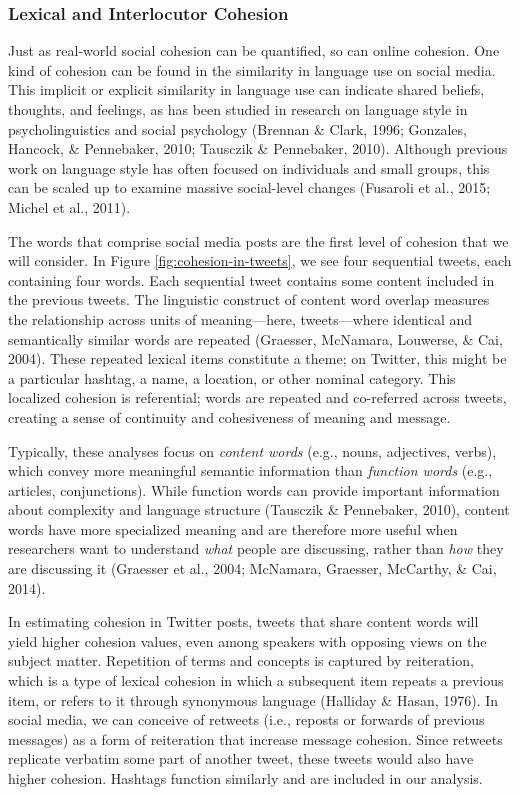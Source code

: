\documentclass[
  english,
  man]{apa6}
\begin{document}
\hypertarget{lexical-and-interlocutor-cohesion}{%
\subsubsection{Lexical and Interlocutor Cohesion}\label{lexical-and-interlocutor-cohesion}}

Just as real-world social cohesion can be quantified, so can online cohesion.
One kind of cohesion can be found in the similarity in language use on social
media. This implicit or explicit similarity in language use can indicate shared
beliefs, thoughts, and feelings, as has been studied in research on language
style in psycholinguistics and social psychology (Brennan \& Clark, 1996; Gonzales, Hancock, \& Pennebaker, 2010; Tausczik \& Pennebaker, 2010). Although previous work on language style has often
focused on individuals and small groups, this can be scaled up to examine
massive social-level changes (Fusaroli et al., 2015; Michel et al., 2011).

The words that comprise social media posts are the first level of cohesion that
we will consider. In Figure \ref{fig:cohesion-in-tweets}, we see four
sequential tweets, each containing four words. Each sequential tweet contains
some content included in the previous tweets. The linguistic construct of
content word overlap measures the relationship across units of meaning---here,
tweets---where identical and semantically similar words are repeated
(Graesser, McNamara, Louwerse, \& Cai, 2004). These repeated lexical items constitute a theme; on Twitter,
this might be a particular hashtag, a name, a location, or other nominal
category. This localized cohesion is referential; words are repeated and
co-referred across tweets, creating a sense of continuity and cohesiveness of
meaning and message.

Typically, these analyses focus on \emph{content words} (e.g., nouns, adjectives,
verbs), which convey more meaningful semantic information than \emph{function words}
(e.g., articles, conjunctions). While function words can provide important
information about complexity and language structure
(Tausczik \& Pennebaker, 2010), content words have more specialized meaning and
are therefore more useful when researchers want to understand \emph{what} people are
discussing, rather than \emph{how} they are discussing it (Graesser et al., 2004; McNamara, Graesser, McCarthy, \& Cai, 2014).

In estimating cohesion in Twitter posts, tweets that share content words
will yield higher cohesion values, even among speakers with opposing
views on the subject matter. Repetition of terms and concepts is captured by
reiteration, which is a type of lexical cohesion in which a subsequent item
repeats a previous item, or refers to it through synonymous language
(Halliday \& Hasan, 1976). In social media, we can conceive of retweets (i.e., reposts
or forwards of previous messages) as a form of reiteration
that increase message cohesion. Since retweets replicate verbatim some part of
another tweet, these tweets would also have higher cohesion. Hashtags function
similarly and are included in our analysis.
\end{document}
